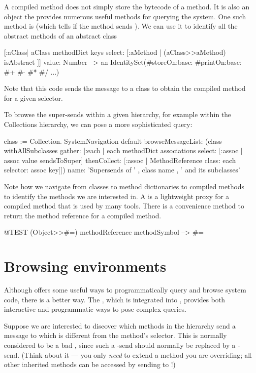 \documentclass[a4paper,10pt,twoside]{book}
\begin{document}
{A compiled method does not simply store the bytecode of a method.
It is also an object the provides numerous useful methods for querying the system.
One such method is  (which tells if the method sends ).
We can use it to identify all the abstract methods of an abstract class
\begin{code}{}
[:aClass| aClass methodDict keys select: [:aMethod |
  (aClass>>aMethod) isAbstract ]] value: Number
  --> an IdentitySet(#storeOn:base: #printOn:base: #+ #- #* #/ ...)
\end{code}
Note that this code sends the \ct{>>} message to a class to obtain the compiled method for a given selector.


To browse the super-sends within a given hierarchy, for example within the Collections hierarchy, we can pose a more sophisticated query:
\begin{code}{}
class := Collection.
SystemNavigation default
  browseMessageList: (class withAllSubclasses gather: [:each |
    each methodDict associations
      select: [:assoc | assoc value sendsToSuper]
      thenCollect: [:assoc | MethodReference class: each selector: assoc key]])
  name: 'Supersends of ' , class name , ' and its subclasses'
\end{code}
Note how we navigate from classes to method dictionaries to compiled methods to identify the methods we are interested in.
A  is a lightweight proxy for a compiled method that is used by many tools.
There is a convenience method  to return the method reference for a compiled method.
\begin{code}{@TEST}
(Object>>#=) methodReference methodSymbol --> #=
\end{code}

\section{Browsing environments}

Although  offers some useful ways to programmatically query and browse system code, there is a better way.  The , which is integrated into \pharo, provides both interactive and programmatic ways to pose complex queries.

Suppose we are interested to discover which methods in the  hierarchy send a message to \super which is different from the method's selector.
This is normally considered to be a bad , since such a \super-send should normally be replaced by a \self-send. (Think about it --- you only \emph{need} \super to extend a method you are overriding; all other inherited methods can be accessed by sending to \self!)

}
\end{document}
